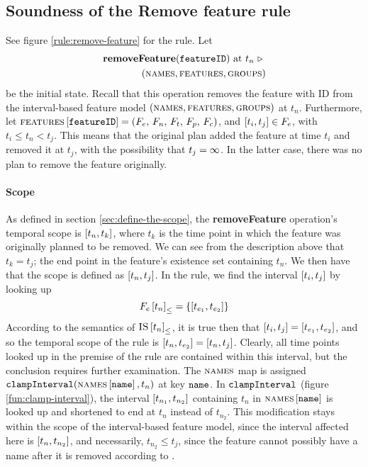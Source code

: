 \subsection{Soundness of the Remove feature rule}
\label{sub:soundness-of-the-remove-feature-rule}

See figure \vref{rule:remove-feature} for the  rule. 
Let 
\begin{equation*}
   \begin{split}
      \textbf{removeFeature}(\texttt{featureID})\text{ at } t_n
      \ \triangleright \  \\
   (\textsc{names}{}, \textsc{features}{}, \textsc{groups}{}{})
\end{split}
\end{equation*}
be the initial state. Recall that this operation removes the feature with ID  from the interval-based feature model $(\textsc{names}{}, \textsc{features}{}, \textsc{groups}{}{})$ at $t_n$. Furthermore, let $\textsc{features} \left[ \texttt{featureID} \right] = \left(F_e,\, F_n,\, F_t,\, F_p,\, F_c\right)$, and $\interval{t_i}{t_j} \in F_e$, with $t_i \leq t_n < t_j$. This means that the original plan added the feature at time $t_i$ and removed it at $t_j$, with the possibility that $t_j = \infty$. In the latter case, there was no plan to remove the feature originally.

\paragraph{Scope}
As defined in section \vref{sec:define-the-scope}, the \textbf{removeFeature} operation's temporal scope is $\interval{t_n}{t_k}$, where $t_k$ is the time point in which the feature was originally planned to be removed. We can see from the description above that $t_k = t_j$; the end point in the feature's existence set containing $t_n$. We then have that the scope is defined as $\interval{t_n}{t_j}$. In the rule, we find the interval $\interval{t_i}{t_j}$ by looking up
\begin{equation*}
   \containing{F_e}{t_n} = \set{\interval{t_{e_1}}{t_{e_2}}}
\end{equation*}
   According to the semantics of ${\textsc{IS} \left[ t_n \right]}_{\leq}$, it is true then that $\interval{t_i}{t_j} = \interval{t_{e_1}}{t_{e_2}}$, and so the temporal scope of the rule is $\interval{t_n}{t_{e_2}} = \interval{t_n}{t_j}$. Clearly, all time points looked up in the premise of the rule are contained within this interval, but the conclusion requires further examination. The $\textsc{names}{}$ map is assigned $\texttt{clampInterval}(\textsc{names} \left[ \texttt{name} \right], t_n)$ at key $\texttt{name}$. In $\texttt{clampInterval}$ (figure \vref{fun:clamp-interval}), the interval $\interval{t_{n_1}}{t_{n_2}}$ containing $t_n$ in $\textsc{names} \left[ \texttt{name} \right]$ is looked up and shortened to end at $t_n$ instead of $t_{n_2}$. This modification stays within the scope of the interval-based feature model, since the interval affected here is $\interval{t_n}{t_{n_2}}$, and necessarily, $t_{n_2} \leq t_j$, since the feature cannot possibly have a name after it is removed according to . 

